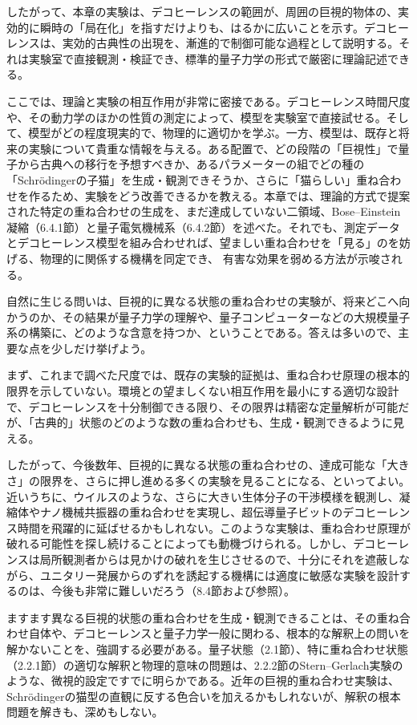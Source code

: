 したがって、本章の実験は、デコヒーレンスの範囲が、周囲の巨視的物体の、実効的に瞬時の「局在化」を指すだけよりも、はるかに広いことを示す。デコヒーレンスは、実効的古典性の出現を、漸進的で制御可能な過程として説明する。それは実験室で直接観測・検証でき、標準的量子力学の形式で厳密に理論記述できる。

ここでは、理論と実験の相互作用が非常に密接である。デコヒーレンス時間尺度や、その動力学のほかの性質の測定によって、模型を実験室で直接試せる。そして、模型がどの程度現実的で、物理的に適切かを学ぶ。一方、模型は、既存と将来の実験について貴重な情報を与える。ある配置で、どの段階の「巨視性」で量子から古典への移行を予想すべきか、あるパラメーターの組でどの種の「Schrödingerの子猫」を生成・観測できそうか、さらに「猫らしい」重ね合わせを作るため、実験をどう改善できるかを教える。本章では、理論的方式で提案された特定の重ね合わせの生成を、まだ達成していない二領域、Bose--Einstein凝縮（6.4.1節）と量子電気機械系（6.4.2節）を述べた。それでも、測定データとデコヒーレンス模型を組み合わせれば、望ましい重ね合わせを「見る」のを妨げる、物理的に関係する機構を同定でき、
\hypertarget{srcpage:290}{}\label{srcpage:290}
有害な効果を弱める方法が示唆される。

自然に生じる問いは、巨視的に異なる状態の重ね合わせの実験が、将来どこへ向かうのか、その結果が量子力学の理解や、量子コンピューターなどの大規模量子系の構築に、どのような含意を持つか、ということである。答えは多いので、主要な点を少しだけ挙げよう。

まず、これまで調べた尺度では、既存の実験的証拠は、重ね合わせ原理の根本的限界を示していない。環境との望ましくない相互作用を最小にする適切な設計で、デコヒーレンスを十分制御できる限り、その限界は精密な定量解析が可能だが、「古典的」状態のどのような数の重ね合わせも、生成・観測できるように見える。

したがって、今後数年、巨視的に異なる状態の重ね合わせの、達成可能な「大きさ」の限界を、さらに押し進める多くの実験を見ることになる、といってよい。近いうちに、ウイルスのような、さらに大きい生体分子の干渉模様を観測し、凝縮体やナノ機械共振器の重ね合わせを実現し、超伝導量子ビットのデコヒーレンス時間を飛躍的に延ばせるかもしれない。このような実験は、重ね合わせ原理が破れる可能性を探し続けることによっても動機づけられる。しかし、デコヒーレンスは局所観測者からは見かけの破れを生じさせるので、十分にそれを遮蔽しながら、ユニタリー発展からのずれを誘起する機構には適度に敏感な実験を設計するのは、今後も非常に難しいだろう（8.4節および\cite{ref286,ref322}参照）。

ますます異なる巨視的状態の重ね合わせを生成・観測できることは、その重ね合わせ自体や、デコヒーレンスと量子力学一般に関わる、根本的な解釈上の問いを解かないことを、強調する必要がある。量子状態（2.1節）、特に重ね合わせ状態（2.2.1節）の適切な解釈と物理的意味の問題は、2.2.2節のStern--Gerlach実験のような、微視的設定ですでに明らかである。近年の巨視的重ね合わせ実験は、Schrödingerの猫型の直観に反する色合いを加えるかもしれないが、解釈の根本問題を解きも、深めもしない。

